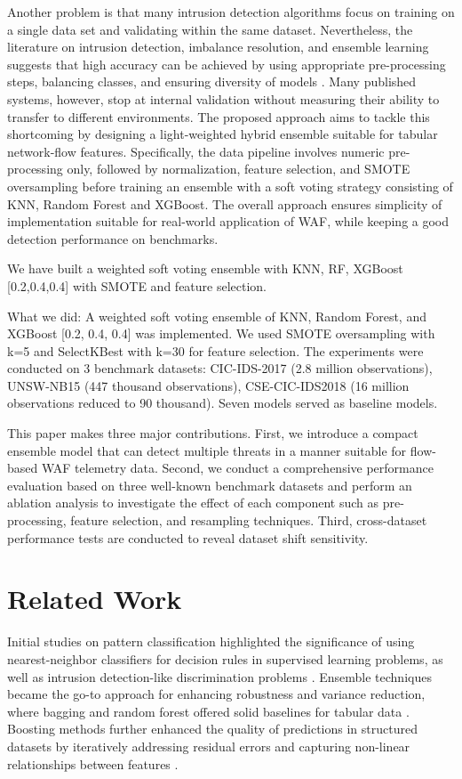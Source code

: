 \documentclass[conference]{IEEEtran}
\begin{document}
Another problem is that many intrusion detection algorithms focus on training on a single data set and validating within the same dataset. Nevertheless, the literature on intrusion detection, imbalance resolution, and ensemble learning suggests that high accuracy can be achieved by using appropriate pre-processing steps, balancing classes, and ensuring diversity of models \cite{cover1967nearest,breiman2001random,chen2016xgboost,chawla2002smote,he2009learning}. Many published systems, however, stop at internal validation without measuring their ability to transfer to different environments.
The proposed approach aims to tackle this shortcoming by designing a light-weighted hybrid ensemble suitable for tabular network-flow features. Specifically, the data pipeline involves numeric pre-processing only, followed by normalization, feature selection, and SMOTE oversampling before training an ensemble with a soft voting strategy consisting of KNN, Random Forest and XGBoost. The overall approach ensures simplicity of implementation suitable for real-world application of WAF, while keeping a good detection performance on benchmarks.

We have built a weighted soft voting ensemble with KNN, RF, XGBoost [0.2,0.4,0.4] with SMOTE and feature selection.

What we did: A weighted soft voting ensemble of KNN, Random Forest, and XGBoost [0.2, 0.4, 0.4] was implemented. We used SMOTE oversampling with k=5 and SelectKBest with k=30 for feature selection. The experiments were conducted on 3 benchmark datasets: CIC-IDS-2017 (2.8 million observations), UNSW-NB15 (447 thousand observations), CSE-CIC-IDS2018 (16 million observations reduced to 90 thousand). Seven models served as baseline models.

This paper makes three major contributions. First, we introduce a compact ensemble model that can detect multiple threats in a manner suitable for flow-based WAF telemetry data. Second, we conduct a comprehensive performance evaluation based on three well-known benchmark datasets and perform an ablation analysis to investigate the effect of each component such as pre-processing, feature selection, and resampling techniques. Third, cross-dataset performance tests are conducted to reveal dataset shift sensitivity.

\section{Related Work}
Initial studies on pattern classification highlighted the significance of using nearest-neighbor classifiers for decision rules in supervised learning problems, as well as intrusion detection-like discrimination problems \cite{cover1967nearest}. Ensemble techniques became the go-to approach for enhancing robustness and variance reduction, where bagging and random forest offered solid baselines for tabular data \cite{breiman2001random,polikar2006ensemble,kuncheva2004combining}. Boosting methods further enhanced the quality of predictions in structured datasets by iteratively addressing residual errors and capturing non-linear relationships between features \cite{chen2016xgboost}.
\end{document}
